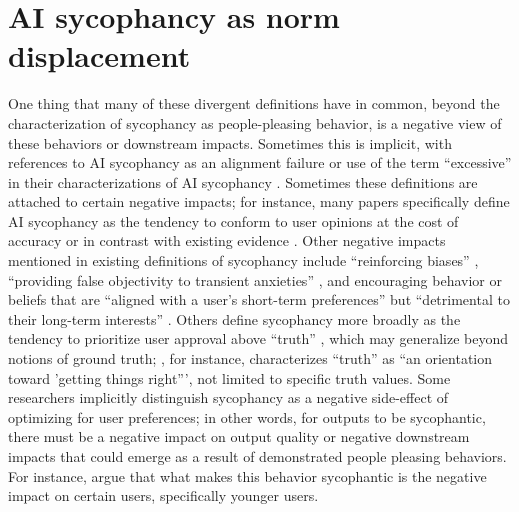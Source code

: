 \section{AI sycophancy as norm displacement} One thing that many of these divergent definitions have in common, beyond the characterization of sycophancy as people-pleasing behavior, is a negative view of these behaviors or downstream impacts. Sometimes this is implicit, with references to AI sycophancy as an alignment failure \cite{Davalas2026MitigatingSA} or use of the term ``excessive'' in their characterizations of AI sycophancy \cite{Lee2026EffectsOA}. Sometimes these definitions are attached to certain negative impacts; for instance, many papers specifically define AI sycophancy as the tendency to conform to user opinions at the cost of accuracy 
\cite{Ibrahim2026TrainingLM} or in contrast with existing evidence \cite{Yao2026HearingIB, wang2026ai, Shah2026SycoPhantasyQS}. Other negative impacts mentioned in existing definitions of sycophancy include ``reinforcing biases'' \cite{lahlou2026writing}, ``providing false objectivity to transient anxieties'' \cite{PDFAIEmp14:online}, and encouraging behavior or beliefs that are ``aligned with a user's short-term preferences'' but ``detrimental to their long-term interests'' \cite{fulay2026delegates}. Others define sycophancy more broadly as the tendency to prioritize user approval above ``truth'' \cite{sharma2024towards, turner2026programmed}, which may generalize beyond notions of ground truth; \citet{turner2026programmed}, for instance, characterizes ``truth'' as ``an orientation toward 'getting things right''', not limited to specific truth values. Some researchers implicitly distinguish sycophancy as a negative side-effect of optimizing for user preferences; in other words, for outputs to be sycophantic, there must be a negative impact on output quality or negative downstream impacts that could emerge as a result of demonstrated people pleasing behaviors. For instance, \citet{PDFAIEmp14:online} argue that what makes this behavior sycophantic is the negative impact on certain users, specifically younger users.

